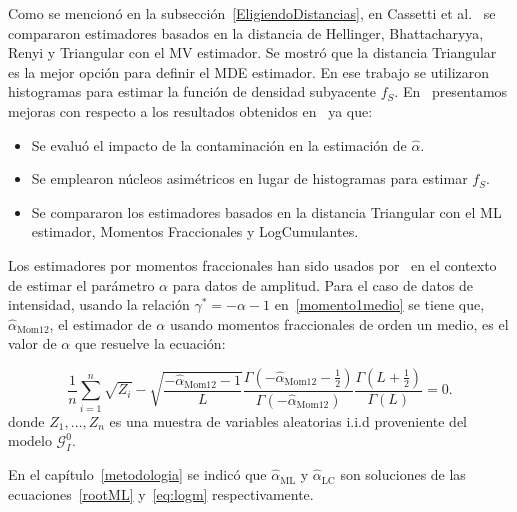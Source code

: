 Como se mencionó en la subsección~\ref{EligiendoDistancias}, en Cassetti et al.~\cite{APSAR2013ParameterEstimationStochasticDistances} se compararon estimadores basados en la distancia de Hellinger, Bhattacharyya, Renyi y Triangular con el MV estimador. Se mostró que la distancia Triangular es la mejor opción para definir el MDE estimador. En ese trabajo se utilizaron histogramas para estimar la función de densidad subyacente $f_S$. En~\cite{gambini2015} %
presentamos mejoras con respecto a los resultados obtenidos en~\cite{APSAR2013ParameterEstimationStochasticDistances} ya que: 
\begin{itemize}
	\item Se evaluó el impacto de la contaminación en la estimación de $\widehat{\alpha}$.
	\item Se emplearon núcleos asimétricos en lugar de histogramas para estimar $f_S$.
	\item Se compararon los estimadores basados en la distancia Triangular con el ML estimador, Momentos Fraccionales y LogCumulantes. 
\end{itemize}

Los estimadores por momentos fraccionales han sido usados por~\cite{Frery97,GambiniSC08} en el contexto de estimar el parámetro $\alpha$ para datos de amplitud. Para el caso de datos de intensidad, usando la relación $\gamma^*=-\alpha-1$ en~\ref{momento1medio} se tiene que, $\widehat{\alpha}_\text{Mom12}$, el estimador de $\alpha$ usando momentos fraccionales de orden un medio, es el valor de $\alpha$ que resuelve la ecuación:

\begin{equation}
\frac{1}{n} \sum_{i=1}^n \sqrt{Z_i} -\sqrt{\frac{-\widehat\alpha_{\text{Mom12}}-1}{L}}\frac{\Gamma ( -\widehat\alpha_{\text{Mom12}}-{\frac{1}{2}} )}{ \Gamma (-\widehat\alpha_{\text{Mom12}}) }
\frac{\Gamma (L+{\frac{1}{2}} )}{\Gamma (L)}=0.
\label{estim_moment1_2_gI0}
\end{equation}
donde $Z_1,\ldots,Z_n$ es una muestra de variables aleatorias i.i.d proveniente del modelo $\mathcal{G}_I^0$.

En el capítulo~\ref{metodologia} se indicó que $\widehat{\alpha}_\text{ML}$ y $\widehat{\alpha}_\text{LC}$ son soluciones de las ecuaciones~\ref{rootML} y~\ref{eq:logm} respectivamente.

